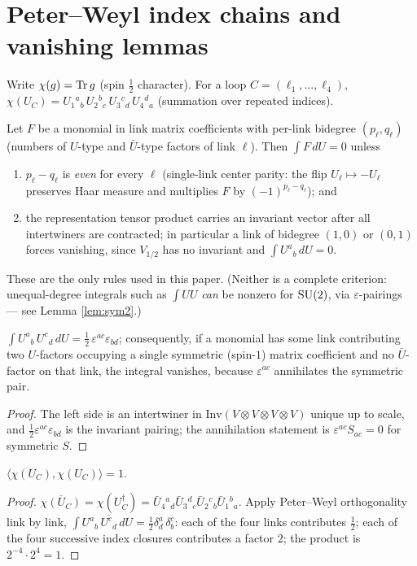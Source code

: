 \appendix
\section{Peter--Weyl index chains and vanishing lemmas}\label{app:A}
Write $\chi(g)=\operatorname{Tr} g$ (spin $\tfrac12$ character). For a loop
$C=(\ell_1,\dots,\ell_4)$,
$\chi(U_C)=U_1{}^{a}{}_{b}\,U_2{}^{b}{}_{c}\,U_3{}^{c}{}_{d}\,
U_4{}^{d}{}_{a}$ (summation over repeated indices).

\begin{lemma}\label{lem:degree}
Let $F$ be a monomial in link matrix coefficients with per-link bidegree
$(p_\ell,q_\ell)$ (numbers of $U$-type and $\bar U$-type factors of link
$\ell$). Then $\int F\,dU=0$ unless
\begin{enumerate}
\item[(i)] $p_\ell-q_\ell$ is \emph{even} for every $\ell$ (single-link
center parity: the flip $U_\ell\mapsto -U_\ell$ preserves Haar measure and
multiplies $F$ by $(-1)^{p_\ell-q_\ell}$); and
\item[(ii)] the representation tensor product carries an invariant vector
after all intertwiners are contracted; in particular a link of bidegree
$(1,0)$ or $(0,1)$ forces vanishing, since $V_{1/2}$ has no invariant and
$\int U^a{}_b\,dU=0$.
\end{enumerate}
These are the only rules used in this paper. (Neither is a complete
criterion: unequal-degree integrals such as $\int UU$ \emph{can} be nonzero
for ${\mathrm{SU}}(2)$, via $\varepsilon$-pairings --- see Lemma \ref{lem:sym2}.)
\end{lemma}

\begin{lemma}\label{lem:sym2}
$\displaystyle\int U^a{}_b\,U^c{}_d\,dU=\tfrac12\,\varepsilon^{ac}
\varepsilon_{bd}$; consequently, if a monomial has some link contributing
two $U$-factors occupying a single symmetric (spin-$1$) matrix coefficient
and no $\bar U$-factor on that link, the integral vanishes, because
$\varepsilon^{ac}$ annihilates the symmetric pair.
\end{lemma}
\begin{proof}
The left side is an intertwiner in $\mathrm{Inv}(V\otimes V\otimes V\otimes V)$
unique up to scale, and $\tfrac12\varepsilon^{ac}\varepsilon_{bd}$ is the
invariant pairing; the annihilation statement is $\varepsilon^{ac}S_{ac}=0$
for symmetric $S$.
\end{proof}

\begin{lemma}\label{lem:gramA}
$\langle\chi(U_C),\chi(U_C)\rangle=1$.
\end{lemma}
\begin{proof}
$\overline{\chi(U_C)}=\chi(U_C^\dagger)
=\bar U_4{}^{a}{}_{d}\bar U_3{}^{d}{}_{c}\bar U_2{}^{c}{}_{b}\bar U_1{}^{b}{}_{a}$.
Apply Peter--Weyl orthogonality link by link,
$\int U^a{}_b\,\overline{U^c{}_d}\,dU=\tfrac12\delta^a_d\,\delta^c_b$:
each of the four links contributes $\tfrac12$; each of the four successive
index closures contributes a factor $2$; the product is
$2^{-4}\cdot 2^{4}=1$.
\end{proof}

